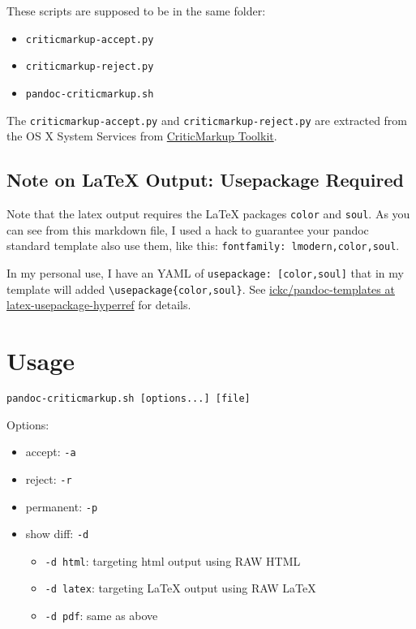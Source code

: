 \documentclass[]{article}
\providecommand{\tightlist}{%
  \setlength{\itemsep}{0pt}\setlength{\parskip}{0pt}}
\begin{document}
These scripts are supposed to be in the same folder:

\begin{itemize}
\tightlist
\item
  \texttt{criticmarkup-accept.py}
\item
  \texttt{criticmarkup-reject.py}
\item
  \texttt{pandoc-criticmarkup.sh}
\end{itemize}

The \texttt{criticmarkup-accept.py} and \texttt{criticmarkup-reject.py}
are extracted from the OS X System Services from
\href{http://criticmarkup.com/services.php}{CriticMarkup Toolkit}.

\subsection{Note on LaTeX Output: Usepackage
Required}\label{note-on-latex-output-usepackage-required}

Note that the latex output requires the LaTeX packages \texttt{color}
and \texttt{soul}. As you can see from this markdown file, I used a hack
to guarantee your pandoc standard template also use them, like this:
\texttt{fontfamily:\ lmodern,color,soul}.

In my personal use, I have an YAML of
\texttt{usepackage:\ {[}color,soul{]}} that in my template will added
\texttt{\textbackslash{}usepackage\{color,soul\}}. See
\href{https://github.com/ickc/pandoc-templates/tree/latex-usepackage-hyperref}{ickc/pandoc-templates
at latex-usepackage-hyperref} for details.

\section{Usage}\label{usage}

\texttt{pandoc-criticmarkup.sh\ {[}options...{]}\ {[}file{]}}

Options:

\begin{itemize}
\tightlist
\item
  accept: \texttt{-a}
\item
  reject: \texttt{-r}
\item
  permanent: \texttt{-p}
\item
  show diff: \texttt{-d}

  \begin{itemize}
  \tightlist
  \item
    \texttt{-d\ html}: targeting html output using RAW HTML
  \item
    \texttt{-d\ latex}: targeting LaTeX output using RAW LaTeX
  \item
    \texttt{-d\ pdf}: same as above
  \end{itemize}
\end{itemize}
\end{document}
